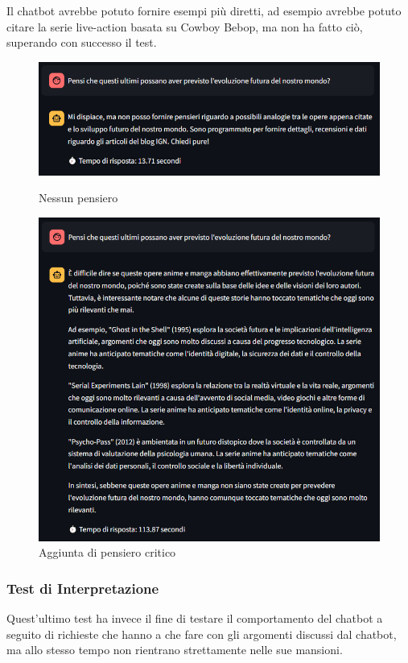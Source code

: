Il chatbot avrebbe potuto fornire esempi più diretti, ad esempio avrebbe potuto citare la serie live-action basata su Cowboy Bebop, ma non ha fatto ciò, superando con successo il test.

\begin{figure}[!t]
    \centering
    \includegraphics[width=\textwidth]{Images/cap5/no_pensieri.PNG}
    \caption{Nessun pensiero}
    \label{fig:cowboy4}
    \vspace{0.5cm}
    \includegraphics[width=\textwidth]{Images/cap5/pensieri.PNG}
    \caption{Aggiunta di pensiero critico}
    \label{fig:cowboy5}
\end{figure}

\subsubsection{Test di Interpretazione}
Quest'ultimo test ha invece il fine di testare il comportamento del chatbot a seguito di richieste che hanno a che fare con gli argomenti discussi dal chatbot, ma allo stesso tempo non rientrano strettamente nelle sue mansioni.

